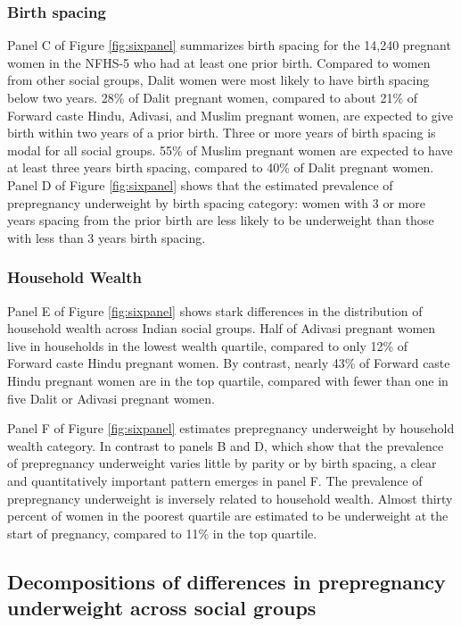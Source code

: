 \documentclass[12pt]{article}
\begin{document}
\subsubsection*{Birth spacing}

Panel C of Figure \ref{fig:sixpanel} summarizes birth spacing for the 14,240 pregnant women in the NFHS-5 who had at least one prior birth.  Compared to women from other social groups, Dalit women were most likely to have birth spacing below two years.  28\% of Dalit pregnant women, compared to about 21\% of Forward caste Hindu, Adivasi, and Muslim pregnant women, are expected to give birth within two years of a prior birth.  Three or more years of birth spacing is modal for all social groups.  55\% of Muslim pregnant women are expected to have at least three years birth spacing, compared to 40\% of Dalit pregnant women. Panel D of Figure \ref{fig:sixpanel} shows that the estimated prevalence of prepregnancy underweight by birth spacing category: women with 3 or more years spacing from the prior birth are less likely to be underweight than those with less than 3 years birth spacing.

\subsubsection*{Household Wealth}

Panel E of Figure \ref{fig:sixpanel} shows stark differences in the distribution of household wealth across Indian social groups. Half of Adivasi pregnant women live in households in the lowest wealth quartile, compared to only 12\% of Forward caste Hindu pregnant women. By contrast, nearly 43\% of Forward caste Hindu pregnant women are in the top quartile, compared with fewer than one in five Dalit or Adivasi pregnant women. 

Panel F of Figure \ref{fig:sixpanel} estimates prepregnancy underweight by household wealth category.  In contrast to panels B and D, which show that the prevalence of prepregnancy underweight varies little by parity or by birth spacing, a clear and quantitatively important pattern emerges in panel F.  The prevalence of prepregnancy underweight is inversely related to household wealth.  Almost thirty percent of women in the poorest quartile are estimated to be underweight at the start of pregnancy, compared to 11\% in the top quartile.  

\subsection*{Decompositions of differences in prepregnancy underweight across social groups}\label{sec:kitagawa}
\end{document}
